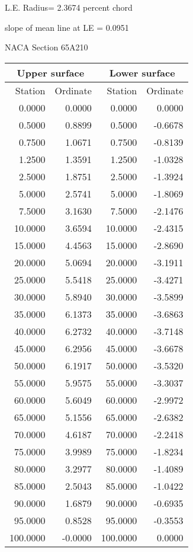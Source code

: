 \documentclass[11pt]{book}
\begin{document}
L.E. Radius=  2.3674 percent chord


 slope of mean line at LE =  0.0951
 \newpage
  \label{s65A210}
 \begin{Large}
 NACA Section 65A210
 \end{Large}
  
 \vspace{8mm}
 \begin{tabular}{|r|r|r|r|} \hline 
 \multicolumn{2}{|c|}{Upper surface} & \multicolumn{2}{|c|}{Lower surface} \\
 \hline
 Station & Ordinate & Station & Ordinate \\
 \hline
0.0000 & 0.0000 & 0.0000 & 0.0000 \\
0.5000 & 0.8899 & 0.5000 & -0.6678 \\
0.7500 & 1.0671 & 0.7500 & -0.8139 \\
1.2500 & 1.3591 & 1.2500 & -1.0328 \\
2.5000 & 1.8751 & 2.5000 & -1.3924 \\
5.0000 & 2.5741 & 5.0000 & -1.8069 \\
7.5000 & 3.1630 & 7.5000 & -2.1476 \\
10.0000 & 3.6594 & 10.0000 & -2.4315 \\
15.0000 & 4.4563 & 15.0000 & -2.8690 \\
20.0000 & 5.0694 & 20.0000 & -3.1911 \\
25.0000 & 5.5418 & 25.0000 & -3.4271 \\
30.0000 & 5.8940 & 30.0000 & -3.5899 \\
35.0000 & 6.1373 & 35.0000 & -3.6863 \\
40.0000 & 6.2732 & 40.0000 & -3.7148 \\
45.0000 & 6.2956 & 45.0000 & -3.6678 \\
50.0000 & 6.1917 & 50.0000 & -3.5320 \\
55.0000 & 5.9575 & 55.0000 & -3.3037 \\
60.0000 & 5.6049 & 60.0000 & -2.9972 \\
65.0000 & 5.1556 & 65.0000 & -2.6382 \\
70.0000 & 4.6187 & 70.0000 & -2.2418 \\
75.0000 & 3.9989 & 75.0000 & -1.8234 \\
80.0000 & 3.2977 & 80.0000 & -1.4089 \\
85.0000 & 2.5043 & 85.0000 & -1.0422 \\
90.0000 & 1.6879 & 90.0000 & -0.6935 \\
95.0000 & 0.8528 & 95.0000 & -0.3553 \\
100.0000 & -0.0000 & 100.0000 & 0.0000 \\
 \hline 
 \end{tabular}
\end{document}
